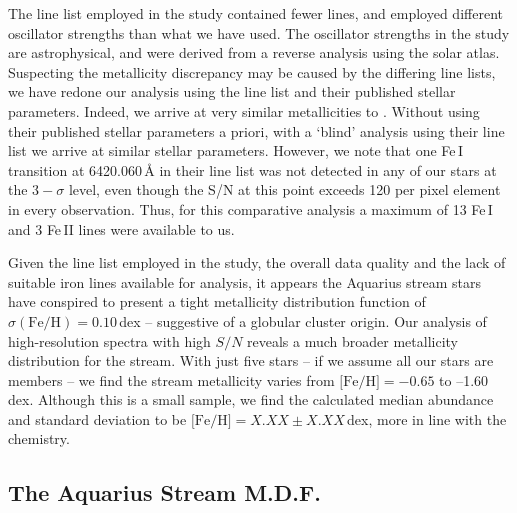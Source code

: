 \documentclass{emulateapj}
\begin{document}
The line list employed in the \citet{wylie-de-boer;et-al_2012} study contained fewer lines, and employed different oscillator strengths than what we have used. The oscillator strengths in the \citet{wylie-de-boer;et-al_2012} study are astrophysical, and were derived from a reverse analysis using the \citet{hinkle;et-al_2003} solar atlas. Suspecting the metallicity discrepancy may be caused by the differing line lists, we have redone our analysis using the \citet{wylie-de-boer;et-al_2012} line list and their published stellar parameters. Indeed, we arrive at very similar metallicities to \citet{wylie-de-boer;et-al_2012}. Without using their published stellar parameters a priori, with a `blind' analysis using their line list we arrive at similar stellar parameters. However, we note that one Fe\,\textsc{I} transition at 6420.060\,\AA{} in their line list was not detected in any of our stars at the $3-\sigma$ level, even though the S/N at this point exceeds 120 per pixel element in every observation. Thus, for this comparative analysis a maximum of 13 Fe\,\textsc{I} and 3 Fe\,\textsc{II} lines were available to us.

Given the line list employed in the \citet{wylie-de-boer;et-al_2012} study, the overall data quality and the lack of suitable iron lines available for analysis, it appears the Aquarius stream stars have conspired to present a tight metallicity distribution function of $\sigma(\mbox{Fe/H}) = 0.10$\,dex -- suggestive of a globular cluster origin. Our analysis of high-resolution spectra with high $S/N$ reveals a much broader metallicity distribution for the stream. With just five stars -- if we assume all our stars are members -- we find the stream metallicity varies from $\mbox{[Fe/H]} = -0.65$ to --1.60\,dex. Although this is a small sample, we find the calculated median abundance and standard deviation to be $\mbox{[Fe/H]} = X.XX \pm X.XX$\,dex, more in line with the \citet{williams;et-al_2011} chemistry.


\subsection{The Aquarius Stream M.D.F.}



\end{document}
